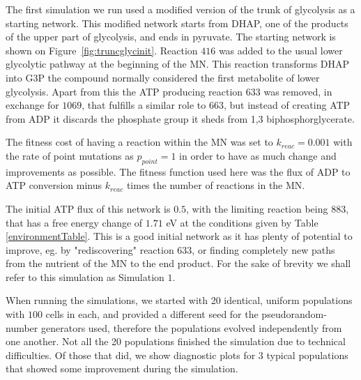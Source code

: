 \documentclass[a4paper,12pt]{article}
\begin{document}
The first simulation we run used a modified version of the trunk of glycolysis as a starting network. This modified network starts from DHAP, one of the products of the upper part of glycolysis,  and ends in pyruvate. The starting network is shown on Figure~\ref{fig:truncglycinit}.  Reaction $416$ was added to the usual lower glycolytic pathway at the beginning of the MN. This reaction transforms DHAP into G3P the compound normally considered the first metabolite of lower glycolysis.  Apart from this the ATP producing reaction $633$ was removed, in exchange for $1069$, that fulfills a similar role to $663$, but instead of creating ATP from ADP it discards the phosphate group it sheds from 1,3 biphosphorglycerate.

The fitness cost of having a reaction within the MN was set to $k_{reac}=0.001$ with the rate of point mutations as $p_{point}=1$ in order to have as much change and improvements as possible. The fitness function used here was the flux of ADP to ATP conversion minus $k_{reac}$ times the number of reactions in the MN.

The initial ATP flux of this network is $0.5$, with the limiting reaction being $883$, that has a free energy change of $1.71$ eV at the conditions given by Table \ref{environmentTable}. This is a good initial network as it has plenty of potential to improve, eg. by "rediscovering" reaction $633$, or finding completely new paths from the nutrient of the MN to the end product. For the sake of brevity we shall refer to this simulation as Simulation $1$.

When running the simulations, we started with 20 identical, uniform populations with $100$ cells in each, and provided a different seed for the pseudorandom-number generators used, therefore the populations evolved independently from one another. Not all the 20 populations finished the simulation due to technical difficulties. Of those that did, we show diagnostic plots for 3 typical populations that showed some improvement during the simulation.
\end{document}

